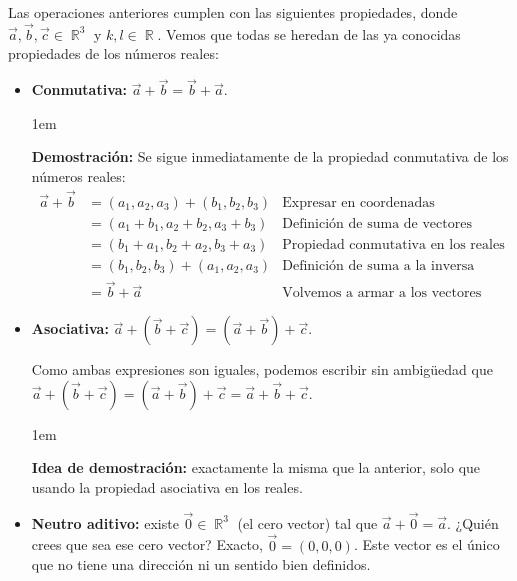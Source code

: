 \documentclass[12pt, fleqn]{report}                             %
\newenvironment{SmallIndentation}[1][0.75em]                    %
    {\begin{adjustwidth}{#1}{}\begin{footnotesize}}                 %
    {\end{footnotesize}\end{adjustwidth}}                           %
\DeclareMathOperator \Reals        {\mathbb{R}}                 %
\begin{document}
            Las operaciones anteriores cumplen con las siguientes propiedades, donde $\vec{a},\vec{b}, \vec{c} \in \Reals^3$ y $k,l \in \Reals$. Vemos que todas se heredan de las ya conocidas propiedades de los números reales:
            \begin{itemize}\setlength\itemsep{0em}
                \item \textbf{Conmutativa:} $\vec{a}+\vec{b} = \vec{b}+\vec{a}$.
                
                \begin{SmallIndentation}[1em]
                    \textbf{Demostración:}
                    Se sigue inmediatamente de la propiedad conmutativa de los números reales:
                    \begin{align*}
                        \vec{a}+\vec{b} &= (a_1, a_2, a_3) + (b_1, b_2, b_3) &\mbox{Expresar en coordenadas}\\
                        &= (a_1 + b_1, a_2 + b_2, a_3 + b_3) &\mbox{Definición de suma de vectores}\\
                        &= (b_1 + a_1, b_2 + a_2, b_3 + a_3) &\mbox{Propiedad conmutativa en los reales}\\
                        &= (b_1, b_2, b_3) + (a_1, a_2, a_3) &\mbox{Definición de suma a la inversa}\\
                        &= \vec{b} + \vec{a} &\mbox{Volvemos a armar a los vectores}
                    \end{align*}
                \end{SmallIndentation}
                
                \item \textbf{Asociativa:} $\vec{a}+\left(\vec{b}+\vec{c}\right) = \left(\vec{a}+\vec{b}\right)+\vec{c}$.
                
                Como ambas expresiones son iguales, podemos escribir sin ambigüedad que $\vec{a}+\left(\vec{b}+\vec{c}\right) = \left(\vec{a}+\vec{b}\right)+\vec{c} = \vec{a}+\vec{b}+\vec{c}$.
                
                \begin{SmallIndentation}[1em]
                    \textbf{Idea de demostración:} exactamente la misma que la anterior, solo que usando la propiedad asociativa en los reales.
                \end{SmallIndentation}
                
                \item \textbf{Neutro aditivo:} existe $\vec{0} \in \Reals^3$ (el cero vector) tal que $\vec{a}+\vec{0}=\vec{a}$. ¿Quién crees que sea ese cero vector? Exacto, $\vec{0}=(0,0,0)$. Este vector es el único que no tiene una dirección ni un sentido bien definidos.
                

\end{itemize}
\end{document}
